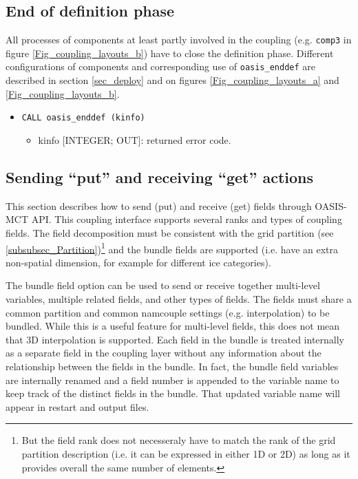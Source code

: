 \subsection{End of definition phase}
\label{subsubsec_Endofdefinition}
All processes of components at least partly involved in the coupling (e.g. {\tt comp3} in figure
    \ref{Fig_coupling_layouts_b}) have to close the definition phase. Different configurations of components and corresponding use of {\tt oasis\_enddef} are described in section \ref{sec_deploy} and on figures \ref{Fig_coupling_layouts_a} and \ref{Fig_coupling_layouts_b}.
\begin{itemize}
\item {\tt CALL oasis\_enddef (kinfo)}
  \begin{itemize}
  \item kinfo [INTEGER; OUT]: returned error code.
  \end{itemize}
\end{itemize}

\subsection{Sending ``put'' and receiving ``get'' actions}
\label{subsubsec_sendingreceiving}

This section describes how to send (put) and receive (get) fields through
OASIS-MCT API.  This coupling interface supports several ranks and
types of coupling fields. 
The field decomposition must be
consistent with the grid partition (see
\ref{subsubsec_Partition})\footnote{But the field rank 
  does not necesseraly have to match the rank of the grid
  partition description (i.e. it can be expressed in either 1D or 2D) as long as it provides overall the same number of elements.} and the bundle fields
are supported (i.e. have an extra non-spatial dimension, for example for
different ice categories).

The bundle field option can be used to
send or receive together multi-level variables, multiple related fields, and other types
of fields.  The fields must share a common partition and common namcouple settings (e.g. interpolation)
to be bundled. While this is a useful feature for multi-level fields, this does not mean
that 3D interpolation is supported.
Each field in the bundle is
treated internally as a separate field in the coupling layer without
any information about the relationship between the fields in the bundle.  In fact,
the bundle field variables are internally renamed and a field number is appended
to the variable name to keep track of the distinct fields in the bundle. That
updated variable name will appear in restart and output files.

